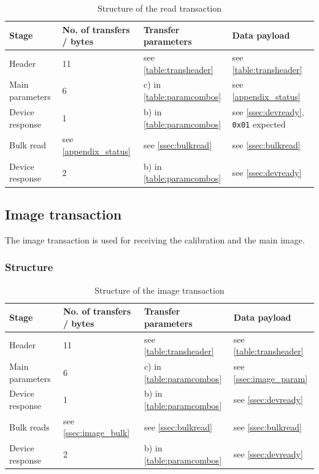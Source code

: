 \documentclass{article}
\begin{document}
\begin{table}[H]
  \caption{Structure of the read transaction}
  \centering
  \begin{tabularx}{\textwidth}{X|X|X|X}
    Stage & No. of transfers / bytes & Transfer parameters & Data payload \\ \hline
    
    Header & 11 & see \autoref{table:transheader} & see \autoref{table:transheader} \\
    Main parameters & 6 & c) in \autoref{table:paramcombos} & see \autoref{appendix_status} \\
    Device response & 1 & b) in \autoref{table:paramcombos} & see \autoref{ssec:devready}, {\tt 0x01} expected \\
    Bulk read & see \autoref{appendix_status} & see \autoref{ssec:bulkread} & see \autoref{ssec:bulkread} \\
    Device response & 2 & b) in \autoref{table:paramcombos} & see \autoref{ssec:devready} \\
  \end{tabularx}
\end{table}


\subsection{Image transaction}

The image transaction is used for receiving the calibration and the main image.

\subsubsection{Structure}

\begin{table}[H]
  \caption{Structure of the image transaction}
  \centering
  \begin{tabularx}{\textwidth}{X|X|X|X}
    Stage & No. of transfers / bytes & Transfer parameters & Data payload \\ \hline
    
    Header & 11 & see \autoref{table:transheader} & see \autoref{table:transheader} \\
    Main parameters & 6 & c) in \autoref{table:paramcombos} & see \autoref{ssec:image_param} \\
    Device response & 1 & b) in \autoref{table:paramcombos} & see \autoref{ssec:devready} \\
    Bulk reads & see \autoref{ssec:image_bulk} & see \autoref{ssec:bulkread} & see \autoref{ssec:bulkread} \\
    Device response & 2 & b) in \autoref{table:paramcombos} & see \autoref{ssec:devready} \\
  \end{tabularx}
\end{table}
\end{document}
